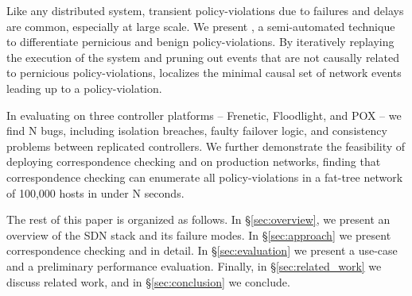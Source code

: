 
 Like any distributed
system, transient policy-violations due to failures and delays are 
common, especially at large scale. We present \simulator{}, a semi-automated
technique to differentiate pernicious and benign policy-violations.
By iteratively replaying the execution of
the system and pruning out events that are not causally related to pernicious
policy-violations, \simulator{} localizes the minimal causal set of network events
leading up to a policy-violation. 

In evaluating \projectname{} on
three controller platforms -- Frenetic, Floodlight, and POX -- we find N bugs,
including isolation breaches,
faulty failover logic, and consistency problems between replicated
controllers. We further demonstrate the feasibility of deploying
correspondence checking and \simulator{} on production networks,
finding that correspondence checking can enumerate all policy-violations in a
fat-tree network of 100,000 hosts in under N seconds.

The rest of this paper is organized as follows. In \S\ref{sec:overview},
we present an overview of the SDN stack and its failure modes.
In \S\ref{sec:approach} we present correspondence checking and
\simulator{} in detail. In \S\ref{sec:evaluation} we present
a use-case and a preliminary performance evaluation.
Finally, in \S\ref{sec:related_work} we discuss related work,
and in \S\ref{sec:conclusion} we conclude.
